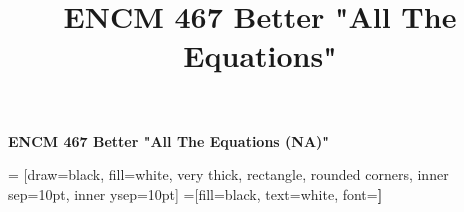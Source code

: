 \documentclass[8pt]{extarticle}
\title{ENCM 467 Better "All The Equations" }
\begin{document}
\begin{center}{\huge{\textbf{ENCM 467 Better "All The Equations (NA)"}}}\\
\end{center}
\begin{multicols*}{3}

 = [draw=black, fill=white, very thick,
    rectangle, rounded corners, inner sep=10pt, inner ysep=10pt]
 =[fill=black, text=white, font=\bfseries]

%






























\end{multicols*}
\end{document}
